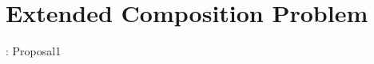 \documentclass[senior,final,11pt]{iscs-thesis}
\begin{document}
\section{Extended Composition Problem}: Proposal1 %





\end{document}
